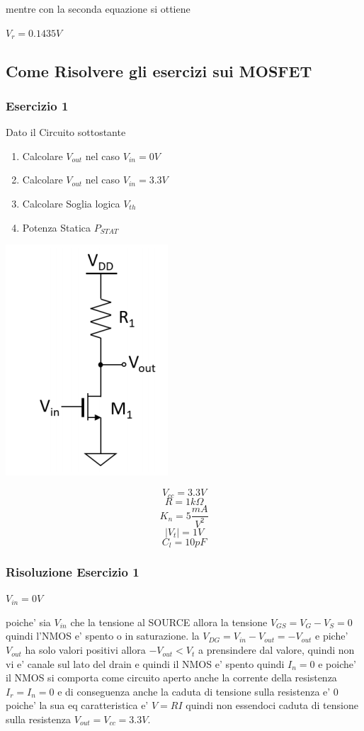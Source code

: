 \documentclass[\main/main.tex]{subfiles}
\begin{document}
mentre con la seconda equazione si ottiene

$V_r = 0.1435V$


\clearpage
\subsection{Come Risolvere gli esercizi sui MOSFET}
\subsubsection{Esercizio 1}
Dato il Circuito sottostante
\begin{enumerate}
\item  Calcolare $V_{out}$ nel caso $V_{in} = 0V$
\item  Calcolare $V_{out}$ nel caso $V_{in} = 3.3V$
\item  Calcolare Soglia logica $V_{th}$
\item  Potenza Statica $P_{STAT}$
\end{enumerate}

\begin{center}
\includegraphics{esercizio1}
\end{center}
\[V_{cc} = 3.3V\]
\[R = 1k\Omega\]
\[K_n = 5 \frac{mA}{V^2}\]
\[|V_t| = 1V\]
\[C_l = 10pF\]

\clearpage
\subsubsection{Risoluzione Esercizio 1}
\textbf{$V_{in} = 0V$}

poiche' sia $V_{in}$ che la tensione al SOURCE allora la tensione $V_{GS} = V_G - V_S = 0$ quindi l'NMOS e' spento o in saturazione.
la $V_{DG} = V_{in} - V_{out} = -V_{out}$ e piche' $V_{out}$ ha solo valori positivi allora $-V_{out} < V_t$ a prensindere dal valore, quindi non vi e' canale sul lato del drain e quindi il NMOS e' spento quindi $I_n = 0$ e poiche' il NMOS si comporta come circuito aperto anche la corrente della resistenza $I_r = I_n = 0$ e di conseguenza anche la caduta di tensione sulla resistenza e' $0$ poiche' la sua eq caratteristica e' $V = RI$ quindi non essendoci caduta di tensione sulla resistenza $V_{out} = V_{cc} = 3.3V$.
\end{document}
